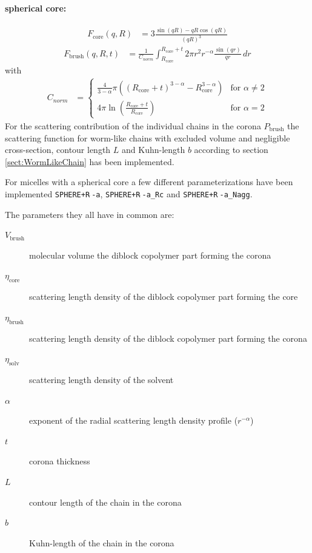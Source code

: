 \vspace{5mm}

\noindent
\paragraph{spherical core:}

\begin{align}
F_\text{core}(q,R) &= 3\frac{\sin(qR)-qR\cos(qR)}{(qR)^3}
\end{align}
\begin{align}
F_\text{brush}(q,R,t)&= \frac{1}{C_{norm}}
   \int_{R_\text{core}}^{R_\text{core}+t} 2\pi r^2 r^{-\alpha} \frac{\sin(qr)}{qr} \, dr
\end{align}
with
\begin{align}
C_{norm} &=
\begin{cases}
\frac{4}{3-\alpha} \pi \left(\left(R_\text{core}+t\right)^{3-\alpha} - R_\text{core}^{3-\alpha}\right)
& \text{for~} \alpha \neq 2 \\
4\pi\ln\left(\frac{R_\text{core}+t}{R_\text{core}}\right)
& \text{for~} \alpha = 2
\end{cases} \nonumber
\end{align}
For the scattering contribution of the individual chains in the corona
$P_\text{brush}$ the scattering function for worm-like chains with excluded
volume and negligible cross-section, contour length $L$ and Kuhn-length $b$
according to section \ref{sect:WormLikeChain} has been implemented.

For micelles with a spherical core a few different parameterizations have been
implemented \texttt{SPHERE+R$\hat{~}$-a}, \texttt{SPHERE+R$\hat{~}$-a\_Rc} and
\texttt{SPHERE+R$\hat{~}$-a\_Nagg}.

\vspace{3mm}

\noindent
The parameters they all have in common are:
\begin{description}
\item[$V_\text{brush}$] molecular volume the diblock copolymer part forming the corona
\item[$\eta_\text{core}$] scattering length density of the diblock copolymer part forming the core
\item[$\eta_\text{brush}$] scattering length density of the diblock copolymer part forming the corona
\item[$\eta_\text{solv}$] scattering length density of the solvent
\item[$\alpha$] exponent of the radial scattering length density profile ($r^{-\alpha}$)
\item[$t$] corona thickness
\item[$L$] contour length of the chain in the corona
\item[$b$] Kuhn-length of the chain in the corona
\end{description}

